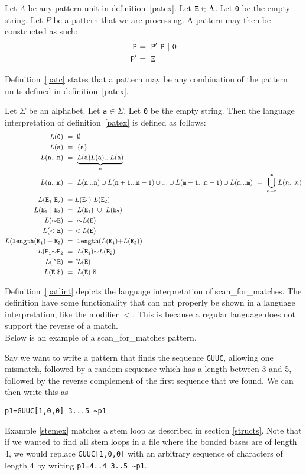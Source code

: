 \begin{mydef}\label{patc}
Let $\Lambda$ be any pattern unit in definition~\ref{patex}. Let ${\tt E}\in\Lambda$.
Let {\tt 0} be the empty string. Let $P$ be a pattern that we are processing.
A pattern may then be constructed as such: 
\begin{align*}
{\tt P~} &{\tt =~P'~P~|~0}\\
{\tt P'~} &{\tt=~E}
\end{align*}
\end{mydef}
Definition~\ref{patc} states that a pattern may be any combination of the pattern 
units defined in definition~\ref{patex}.
\begin{mydef}\label{patlint}
Let $\Sigma$ be an alphabet. Let {\tt a$\in\Sigma$}. Let {\tt 0} be the empty 
string.
Then the language interpretation of definition~\ref{patex} is defined as follows:
\begin{align*}
L({\tt 0})~&=~\emptyset\\
L({\tt a})~&=~\{{\tt a}\}\\
L({\tt n...n})~&=~\underbrace{L({\tt a})L({\tt a})...L({\tt a})}_\text{n}\\
L({\tt n...m})~&=~L({\tt n...n})\cup L({\tt n+1...n+1})\cup...\cup L({\tt m-1...m-1})\cup L({\tt m...m})~=~\bigcup\limits_{n={\tt n}}^{\tt m} L(n...n)\\
L({\tt E_1~E_2})~&=L({\tt E_1})~L({\tt E_2})\\
L({\tt E_1~|~E_2})~&=~L({\tt E}_{\tt 1})~\cup~L({\tt E}_{\tt 2})\\
L({\tt {\sim}E})~&=~{\sim}L({\tt E})\\
L({\tt <E})~&=~<L({\tt E})\\
L({\tt length(E_ 1 )+ E_2} )~&=~{\tt length(}L({\tt E_1}){\tt+} L({\tt E_2 )})\\
L({\tt E_1{\sim}E_2}~&=~L({\tt E_1}){\sim}L({\tt E_2})\\
L({\tt~\hat{}~E})~&=~\hat{} L({\tt E})\\
L({\tt E~\$})~&=~L({\tt E})~\$
\end{align*}
\end{mydef}
Definition~\ref{patlint} depicts the language interpretation of scan\_for\_matches.
The definition have some functionality that can not properly be 
shown in a language interpretation, like the modifier $<$. This is because 
a regular language does not support the reverse of a match. 
\\Below is an example of a scan\_for\_matches pattern.
\begin{myex}\label{stemex}
Say we want to write a pattern that finds the sequence {\tt GUUC}, allowing 
one mismatch, followed by a random sequence which has a length between 3 and 5, 
followed by the reverse complement of the first sequence that we found. We can 
then write this as \begin{center}
{\tt p1=GUUC[1,0,0] 3...5 \textasciitilde p1}
\end{center}
\end{myex}
Example \ref{stemex} matches a stem loop as described in section 
\ref{structs}. Note that if we wanted to find all stem loops in a file where 
the bonded bases are of length 
4, we would replace {\tt GUUC[1,0,0]} with an arbitrary sequence of characters of length $4$ 
by writing {\tt p1=4..4 3..5 \textasciitilde p1}.